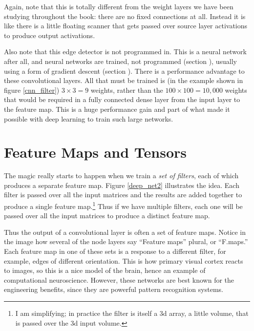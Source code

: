 Again, note that this is totally different from the weight layers we have been studying throughout the book: there are no fixed connections at all. Instead it is like there is a little floating scanner that gets passed over source layer activations to produce output activations.

Also note that this edge detector is not programmed in. This is a neural network after all, and neural networks are trained, not programmed (section ), usually using a form of gradient descent (section ). There is a performance advantage to these convolutional layers. All that must be trained is (in the example shown in figure \ref{cnn_filter}) $3 \times 3=9$ weights, rather than the $100 \times 100 = 10,000$ weights that would be required in a fully connected dense layer from the input layer to the feature map. This is a huge performance gain and part of what  made it possible with deep learning to train such large networks.

\section{Feature Maps and Tensors}

The magic really starts to happen when we train a \emph{set of filters}, each of which produces a separate feature map.  Figure \ref{deep_net2} illustrates the idea. Each filter is passed over all the input matrices and the results are added together to produce a single feature map.\footnote{I am simplifying; in practice the filter is itself a 3d array, a little volume, that is passed over the 3d input volume.}  Thus if we have multiple filters, each one will be passed over all the input matrices to produce a distinct feature map.  

Thus the output of a convolutional layer is often a set of feature maps. Notice in the image how several of the node layers say ``Feature maps'' plural, or ``F.maps.'' Each feature map in one of these sets is a response to a different filter, for example, edges of different orientation. This is how primary visual cortex reacts to images, so this is a nice model of the brain, hence an example of computational  neuroscience. However, these networks are best known for the engineering benefits, since they are powerful pattern recognition systems.


